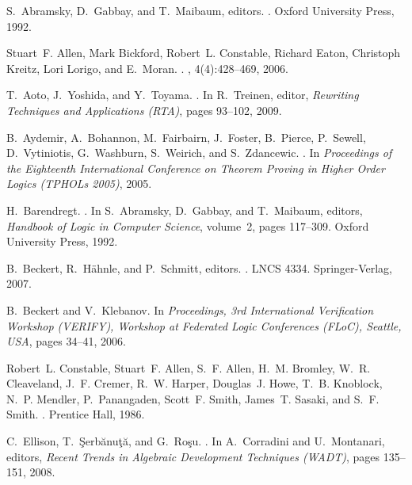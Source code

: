 \documentclass{LMCS}
\begin{document}
\begin{thebibliography}{10}

S.~Abramsky, D.~Gabbay, and T.~Maibaum, editors.
.
\newblock Oxford University Press, 1992.

Stuart~F. Allen, Mark Bickford, Robert~L. Constable, Richard Eaton, Christoph
  Kreitz, Lori Lorigo, and E.~Moran.
.
, 4(4):428--469, 2006.

T.~Aoto, J.~Yoshida, and Y.~Toyama.
.
\newblock In R.~Treinen, editor, {\em Rewriting Techniques and Applications
  (RTA)}, pages 93--102, 2009.

B.~Aydemir, A.~Bohannon, M.~Fairbairn, J.~Foster, B.~Pierce, P.~Sewell,
  D.~Vytiniotis, G.~Washburn, S.~Weirich, and S.~Zdancewic.
.
\newblock In {\em Proceedings of the Eighteenth International Conference on
  Theorem Proving in Higher Order Logics (TPHOLs 2005)}, 2005.

H.~Barendregt.
.
\newblock In S.~Abramsky, D.~Gabbay, and T.~Maibaum, editors, {\em {Handbook of
  Logic in Computer Science}}, volume~2, pages 117--309. Oxford University
  Press, 1992.

B.~Beckert, R.~H\"ahnle, and P.~Schmitt, editors.
.
\newblock LNCS 4334. Springer-Verlag, 2007.

B.~Beckert and V.~Klebanov.
\newblock In {\em Proceedings, 3rd International Verification Workshop
  (VERIFY), Workshop at Federated Logic Conferences (FLoC), Seattle, USA},
  pages 34--41, 2006.

Robert~L. Constable, Stuart~F. Allen, S.~F. Allen, H.~M. Bromley, W.~R.
  Cleaveland, J.~F. Cremer, R.~W. Harper, Douglas~J. Howe, T.~B. Knoblock,
  N.~P. Mendler, P.~Panangaden, Scott~F. Smith, James~T. Sasaki, and S.~F.
  Smith.
.
\newblock Prentice Hall, 1986.

C.~Ellison, T.~\c{S}erb\u{a}nu\c{t}\u{a}, and G.~Ro\c{s}u.
.
\newblock In A.~Corradini and U.~Montanari, editors, {\em Recent Trends in
  Algebraic Development Techniques (WADT)}, pages 135--151, 2008.


\end{thebibliography}
\end{document}
